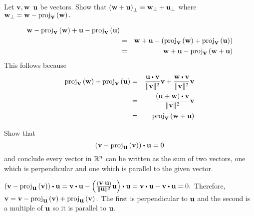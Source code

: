 \begin{enumialphparenastyle}
\begin{ex} \label{perplinear} Let $\mbox{\bf v},\mbox{\bf w}$ $\mbox{\bf u}$ be vectors. Show
that $\left(\mbox{\bf w}+\mbox{\bf u}\right) _{\perp }=\mbox{\bf w}_{\perp }+\mbox{\bf u}_{\perp }$
 where $\mbox{\bf w}_{\perp }=\mbox{\bf w}-\mbox{proj}_{\mbox{\bf v}}\left(\mbox{\bf w}\right) .$
\begin{sol}
\begin{eqnarray*}
\mbox{\bf w}-\mbox{proj}_{\mbox{\bf v}}\left(\mbox{\bf w}\right) +\mbox{\bf u}- \mbox{proj}_{\mbox{\bf v}}\left(\mbox{\bf u}\right) \\
&=&\mbox{\bf w}+\mbox{\bf u}-\left(\mbox{proj}_{\mbox{\bf v}}\left(\mbox{\bf w}\right) +\mbox{proj}_{\mbox{\bf v}}\left(\mbox{\bf u}\right) \right) \\
&=&\mbox{\bf w}+\mbox{\bf u}-\mbox{proj}_{\mbox{\bf v}}\left(\mbox{\bf w}+\mbox{\bf u}\right) 
\end{eqnarray*}
This follows because 
\begin{eqnarray*}
\func{proj}_{\vect{v}}\tup{\vect{w}} +\func{proj}_{\vect{v}}\tup{
\vect{u}} &=& \frac{\vect{u}\dotprod \vect{v}}{\norm{\vect{v}} ^{2}}\vect{v}+
\frac{\vect{w}\dotprod \vect{v}}{\norm{\vect{v}} ^{2}}\vect{v} \\
&=& \frac{\tup{\vect{u}+\vect{w}} \dotprod \vect{v}}{\norm{\vect{v}
} ^{2}}\vect{v} \\
&=& \func{proj}_{\vect{v}}\tup{\vect{w}+\vect{u}}
\end{eqnarray*}
\end{sol}
\end{ex}

\begin{ex} Show that
\begin{equation*}
 \tup{\vect{v}-\func{proj}_{\vect{u}
}\tup{\vect{v}} } \dotprod \vect{u}=0
\end{equation*}
and conclude every vector in $\mathbb{R}^{n}$ can be written as the sum of
two vectors, one which is perpendicular and one which is parallel to the
given vector.
\begin{sol}
$\tup{\vect{v}-\func{proj}_{\vect{u}}\tup{\vect{v}} } \dotprod \vect{u} =  \vect{v} \dotprod \vect{u} -\tup{\frac{\tup{\vect{v}\cdot\vect{u}} }{\norm{\vect{u}} ^{2}}\vect{u} } \dotprod \vect{u} = \vect{v} \dotprod \vect{u} - \vect{v} \dotprod \vect{u} =0.$ Therefore, $\mbox{\bf v} = \mbox{\bf v} - \mbox{proj}_{\mbox{\bf u}}\left(\mbox{\bf v}\right) + \mbox{proj}_{\mbox{\bf u}}\left(\mbox{\bf v}\right).$ The first is perpendicular to $\mbox{\bf u}$ and the second is a multiple
of $\mbox{\bf u}$ so it is parallel to $\mbox{\bf u}$.
\end{sol}
\end{ex}

\end{enumialphparenastyle}
